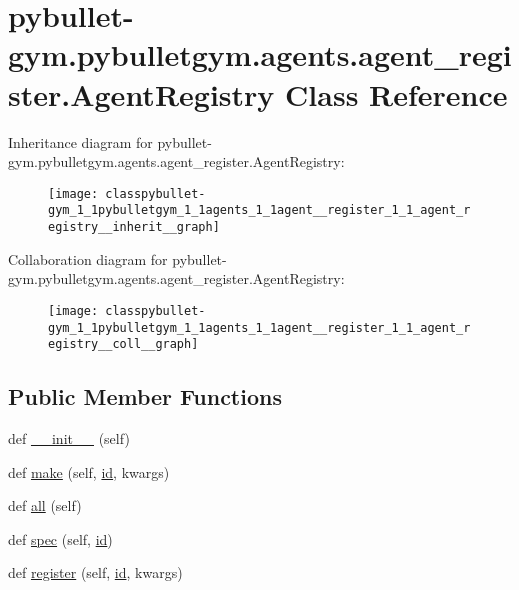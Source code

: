 \hypertarget{classpybullet-gym_1_1pybulletgym_1_1agents_1_1agent__register_1_1_agent_registry}{}\section{pybullet-\/gym.pybulletgym.\+agents.\+agent\+\_\+register.\+Agent\+Registry Class Reference}
\label{classpybullet-gym_1_1pybulletgym_1_1agents_1_1agent__register_1_1_agent_registry}


Inheritance diagram for pybullet-\/gym.pybulletgym.\+agents.\+agent\+\_\+register.\+Agent\+Registry\+:
\nopagebreak
\begin{figure}[H]
\begin{center}
\leavevmode
\texttt{[image: classpybullet-gym\_1\_1pybulletgym\_1\_1agents\_1\_1agent\_\_register\_1\_1\_agent\_registry\_\_inherit\_\_graph]}
\end{center}
\end{figure}


Collaboration diagram for pybullet-\/gym.pybulletgym.\+agents.\+agent\+\_\+register.\+Agent\+Registry\+:
\nopagebreak
\begin{figure}[H]
\begin{center}
\leavevmode
\texttt{[image: classpybullet-gym\_1\_1pybulletgym\_1\_1agents\_1\_1agent\_\_register\_1\_1\_agent\_registry\_\_coll\_\_graph]}
\end{center}
\end{figure}
\subsection*{Public Member Functions}
\begin{DoxyCompactItemize}
\item 
def \hyperlink{classpybullet-gym_1_1pybulletgym_1_1agents_1_1agent__register_1_1_agent_registry_ac8e2f35c3fd8d2a0afadafba0503d99a}{\+\_\+\+\_\+init\+\_\+\+\_\+} (self)
\item 
def \hyperlink{classpybullet-gym_1_1pybulletgym_1_1agents_1_1agent__register_1_1_agent_registry_a0cdc3d1fb602dd95846ae80ed601aacb}{make} (self, \hyperlink{namespacepybullet-gym_1_1pybulletgym_1_1agents_a0c7585c58d4374c748bb1a19ca9ae5b7}{id}, kwargs)
\item 
def \hyperlink{classpybullet-gym_1_1pybulletgym_1_1agents_1_1agent__register_1_1_agent_registry_abdcb454ed047331ca97b715b7961b17d}{all} (self)
\item 
def \hyperlink{classpybullet-gym_1_1pybulletgym_1_1agents_1_1agent__register_1_1_agent_registry_a97528720c973ae9774edfd462647bbd9}{spec} (self, \hyperlink{namespacepybullet-gym_1_1pybulletgym_1_1agents_a0c7585c58d4374c748bb1a19ca9ae5b7}{id})
\item 
def \hyperlink{classpybullet-gym_1_1pybulletgym_1_1agents_1_1agent__register_1_1_agent_registry_a3ffb470796e41e748dff17b861416f1f}{register} (self, \hyperlink{namespacepybullet-gym_1_1pybulletgym_1_1agents_a0c7585c58d4374c748bb1a19ca9ae5b7}{id}, kwargs)
\end{DoxyCompactItemize}
